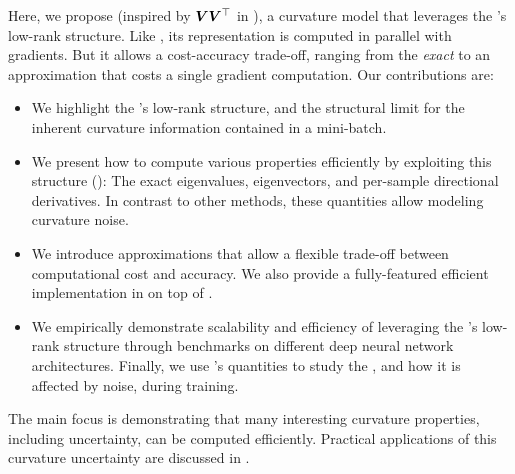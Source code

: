 Here, we propose \vivit (inspired by ${\bm{V}}{\bm{V}}^\top$ in
), a curvature model that leverages the \ggn's
low-rank structure. Like \kfac, its representation is computed in parallel with
gradients. But it allows a cost-accuracy trade-off, ranging from the
\emph{exact} \ggn to an approximation that costs a single gradient computation.
Our contributions are:
\begin{itemize}
\item We highlight the \ggn's low-rank structure, and the structural limit
  for the inherent curvature information contained in a mini-batch.

\item We present how to compute various \ggn properties efficiently by
  exploiting this structure (): The exact eigenvalues,
  eigenvectors, and per-sample directional derivatives. In contrast to other
  methods, these quantities allow modeling curvature noise.

\item We introduce approximations that allow a flexible trade-off between
  computational cost and accuracy. We also provide a fully-featured efficient
  implementation in \pytorch \citep{paszke2019pytorch} on top of \backpack
  \citep{dangel2020backpack}.

\item We empirically demonstrate scalability and efficiency of leveraging the
  \ggn's low-rank structure through benchmarks on different deep neural network
  architectures. Finally, we use \vivit's quantities to study the \ggn, and how
  it is affected by noise, during training.
\end{itemize}

The main focus is demonstrating that many interesting curvature
properties, including uncertainty, can be computed efficiently. Practical
applications of this curvature uncertainty are discussed in
.

